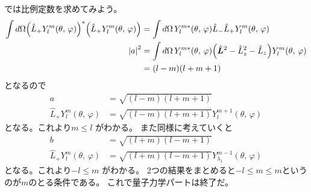 \documentclass[../../master.tex]{subfiles}
\begin{document}
では比例定数を求めてみよう。
\begin{align}
	\int d\Omega\qty(\hat{L}_+ Y_{l}^m(\theta,\,\varphi))^*
	\qty(\hat{L}_+ Y_{l}^m(\theta,\,\varphi))
	          & = \int d\Omega\, Y_{l}^{m*}(\theta,\,\varphi)\hat{L}_-\hat{L}_+Y_{l}^m(\theta,\,\varphi) \\
	\abs{a}^2 & =\int d\Omega\, Y_{l}^{m*}(\theta,\,\varphi)\qty(\hat{\vb*{L}}^2 -\hat{L}_z^2 -\hat{L}_z)Y_{l}^m(\theta,\,\varphi)                                                                            \\
	          & =(l-m)(l+m+1)
\end{align}
となるので
\begin{align}
	a                                & = \sqrt{(l-m)(l+m+1)}                            \\
	\hat{L}_+Y_l^m(\theta,\,\varphi) & = \sqrt{(l-m)(l+m+1)}Y_l^{m+1}(\theta,\,\varphi)
\end{align}
となる。これより\(m\leq l\) がわかる。
また同様に考えていくと
\begin{align}
	b                                & = \sqrt{(l+m)(l-m+1)}                                      \\
	\hat{L}_+Y_l^m(\theta,\,\varphi) & = \sqrt{(l+m)(l-m+1)}Y_{\lambda_1}^{m-1}(\theta,\,\varphi)
\end{align}
となる。これより\(-l\leq m\) がわかる。
2つの結果をまとめると\(-l \leq m \leq m\)というのが\(m\)のとる条件である。
これで量子力学パートは終了だ。
\end{document}
